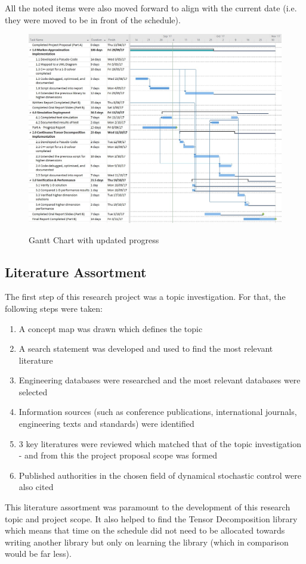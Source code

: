\documentclass[11pt,draftd]{article}
\begin{document}
\noindent All the noted items were also moved forward to align with the current date (i.e. they were moved to be in front of the schedule).
\[\]
\begin{figure}[h!]
	\centering
	\includegraphics[scale=0.54]{UpdatedGanttProgressSem2}
	\label{UpdatedGanttProgress}
	\caption{Gantt Chart with updated progress}
\end{figure}
\newpage

\subsection{Literature Assortment}
The first step of this research project was a topic investigation. For that, the following steps were taken:
\begin{enumerate}
	\item A concept map was drawn which defines the topic
	\item A search statement was developed and used to find the most relevant literature
	\item Engineering databases were researched and the most relevant databases were selected
	\item Information sources (such as conference publications, international journals, engineering texts and standards) were identified
	\item 3 key literatures were reviewed which matched that of the topic investigation - and from this the project proposal scope was formed
	\item Published authorities in the chosen field of dynamical stochastic control were also cited	
\end{enumerate}
This literature assortment was paramount to the development of this research topic and project scope. It also helped to find the Tensor Decomposition library which means that time on the schedule did not need to be allocated towards writing another library but only on learning the library (which in comparison would be far less). \\
\end{document}
